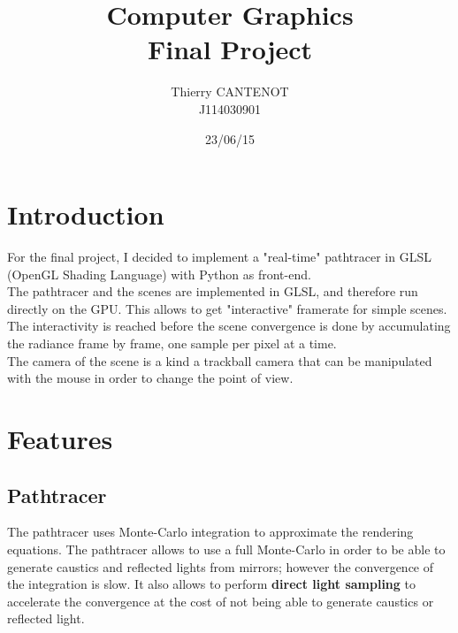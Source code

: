 \documentclass[a4paper,10pt]{article}
\title{\textbf{Computer Graphics} \\ Final Project}
\author{Thierry CANTENOT \\ J114030901}
\date{23/06/15}
\begin{document}
\maketitle

\begin{figure}[!htb]\centering
\end{figure}


\pagebreak
\section{Introduction}

For the final project, I decided to implement a "real-time" pathtracer in GLSL (OpenGL Shading Language) with Python as front-end. \\
The pathtracer and the scenes are implemented in GLSL, and therefore run directly on the GPU. This allows to get "interactive" framerate for simple scenes. The interactivity is reached before the scene convergence is done by accumulating the radiance frame by frame, one sample per pixel at a time.\\
The camera of the scene is a kind a trackball camera that can be manipulated with the mouse in order to change the point of view.

\section{Features}

\subsection{Pathtracer}


The pathtracer uses Monte-Carlo integration to approximate the rendering equations. The pathtracer allows to use a full Monte-Carlo in order to be able to generate caustics and reflected lights from mirrors; however the convergence of the integration is slow. It also allows to perform \textbf{direct light sampling} to accelerate the convergence at the cost of not being able to generate caustics or reflected light.\\
\end{document}
